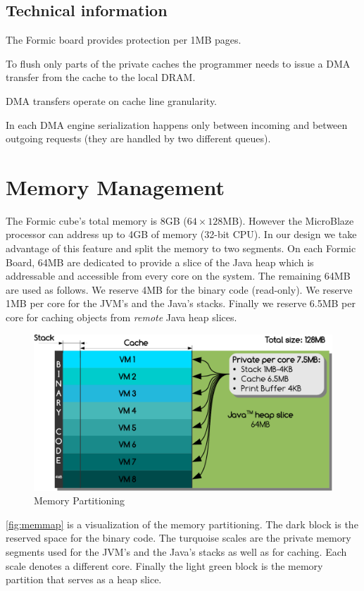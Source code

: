 \documentclass[
a4paper,
12pt,
]{report}
\newcommand{\mblaze}{MicroBlaze\texttrademark\xspace}
\newcommand{\java}{Java\texttrademark\xspace}
\begin{document}
\subsection{Technical information}
The Formic board provides protection per 1MB pages.

To flush only parts of the private caches the programmer needs to
issue a DMA transfer from the cache to the local DRAM.

DMA transfers operate on cache line granularity.

In each DMA engine serialization happens only between incoming and
between outgoing requests (they are handled by two different queues).

\section{Memory Management}
The Formic cube's total memory is 8GB ($64\times128$MB). However the
\mblaze processor can address up to 4GB of memory (32-bit CPU). In our
design we take advantage of this feature and split the memory to two
segments. On each Formic Board, 64MB are dedicated to provide a slice
of the \java heap which is addressable and accessible from every core
on the system. The remaining 64MB are used as follows. We reserve 4MB
for the binary code (read-only). We reserve 1MB per core for the
JVM's and the \java's stacks. Finally we reserve 6.5MB per core for
caching objects from \textit{remote} \java heap slices.

\begin{figure}[!ht]
  \centering
  \includegraphics[width=\linewidth]{memmap}
  \caption{Memory Partitioning}
  \label{fig:memmap}
\end{figure}

\autoref{fig:memmap} is a visualization of the memory
partitioning. The dark block is the reserved space for the binary
code. The turquoise scales are the private memory segments used for
the JVM's and the \java's stacks as well as for caching. Each scale
denotes a different core. Finally the light green block is the memory
partition that serves as a heap slice.
\end{document}
